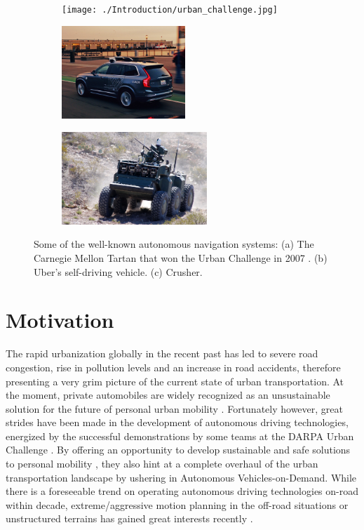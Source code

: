 \documentclass[../thesis.tex]{subfiles}
\begin{document}
\begin{figure}
    \centering
    \begin{subfigure}[b]{0.32\linewidth}
        \texttt{[image: ./Introduction/urban\_challenge.jpg]}
    \end{subfigure}
    \begin{subfigure}[b]{0.32\linewidth}
        \includegraphics[height=3.5cm]{./Introduction/uber.jpg}
    \end{subfigure}
    \begin{subfigure}[b]{0.32\linewidth}
        \includegraphics[height=3.5cm]{./Introduction/crusher.jpg}
    \end{subfigure}
    \caption{Some of the well-known autonomous navigation systems: (a) The Carnegie Mellon Tartan that won the Urban Challenge in 2007 \cite{boss}. (b) Uber's self-driving vehicle. (c) Crusher. \cite{stentz2007crusher}}
    \label{fig:uber_rock}
\end{figure}

\section{Motivation}


The rapid urbanization globally in the recent past has led to severe road congestion, rise in pollution levels and an increase in road accidents, therefore presenting a very grim picture of the current state of urban transportation. 
At the moment, private automobiles are widely recognized as an unsustainable solution for the future of personal urban mobility \cite{reinventing}. 
Fortunately however, great strides have been made in the development of autonomous driving technologies, energized by the successful demonstrations by some teams at the DARPA Urban Challenge \cite{boss, multimodaltartan}. 
By offering an opportunity to develop sustainable and safe solutions to personal mobility \cite{usecases_of_AD}, they also hint at a complete overhaul of the urban transportation landscape by ushering in Autonomous Vehicles-on-Demand. 
While there is a foreseeable trend on operating autonomous driving technologies on-road within decade, extreme/aggressive motion planning in the off-road situations or unstructured terrains has gained great interests recently \cite{kolter2010probabilistic,williams2016aggressive,gray2012predictive,cutler2016autonomous,cutler2014reinforcement}. 
\end{document}
